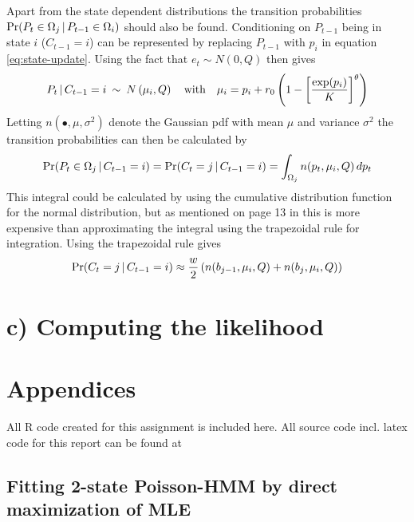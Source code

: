 Apart from the state dependent distributions the transition probabilities $\Pr(P_t\in\Omega_j\,|\, P_{t-1}\in\Omega_i)$ should also be found. Conditioning on $P_{t-1}$ being in state $i$ ($C_{t-1}=i$) can be represented by replacing $P_{t-1}$ with $p_i$ in equation \ref{eq:state-update}. Using the fact that $e_t\sim N(0,Q)$ then gives 
\begin{equation*}
    P_t \,|\, C_{t-1}=i \:\sim\: N\left(\mu_i, Q\right) \quad\text{with}\quad \mu_i = p_i + r_0\left(1-\left[\frac{\exp(p_i)}{K}\right]^\theta\right)
\end{equation*}
%
Letting $n(\bullet, \mu, \sigma^2)$ denote the Gaussian pdf with mean $\mu$ and variance $\sigma^2$ the transition probabilities can then be calculated by
%
\begin{equation*}
    \Pr(P_t\in\Omega_j\,|\, C_{t-1}=i) = \Pr(C_t=j\,|\, C_{t-1}=i) = \int_{\Omega_j} n(p_t, \mu_i, Q)\, dp_t
\end{equation*}
%
This integral could be calculated by using the cumulative distribution function for the normal distribution, but as mentioned on page 13 in \citep{waever11} this is more expensive than approximating the integral using the trapezoidal rule for integration. Using the trapezoidal rule gives
%
\begin{equation*}
    \Pr(C_t = j\,|\, C_{t-1}=i) \approx \frac{w}{2}\left(n(b_{j-1}, \mu_i, Q) + n(b_j, \mu_i, Q)\right)
\end{equation*}


\section*{c) Computing the likelihood}

\FloatBarrier

\pagebreak

\renewcommand\thesection{\Alph{section}}
\section{Appendices}

All R code created for this assignment is included here. All source code incl. latex code for this report can be found at \githuburl

\subsection{Fitting 2-state Poisson-HMM by direct maximization of MLE}
\label{app:2-state-ml-results}


\nocite{zucchini09,waever11}




